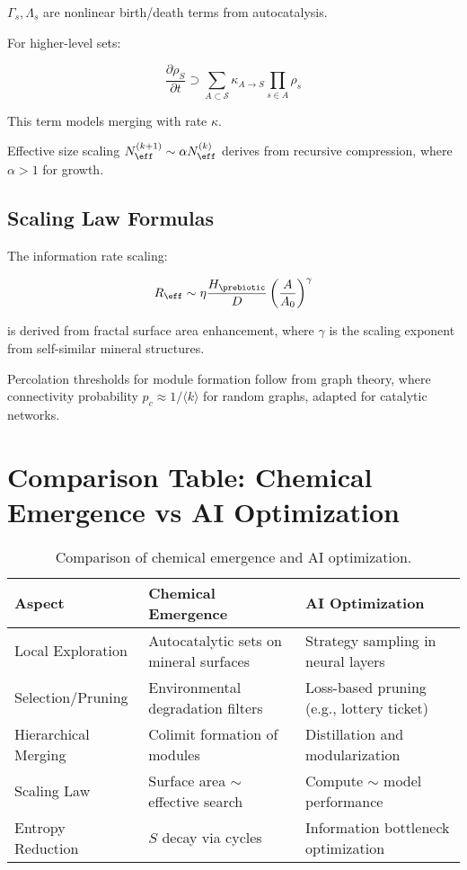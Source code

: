 \documentclass{book}
\begin{document}
$\Gamma_s, \Lambda_s$ are nonlinear birth/death terms from autocatalysis.

For higher-level sets:

\[\frac{\partial \rho_S}{\partial t} \supset \sum_{A \subset \mathcal{S}} \kappa_{A \to S} \prod_{s \in A} \rho_s\]

This term models merging with rate $\kappa$.

Effective size scaling $N_{\eff}^{(k+1)} \sim \alpha N_{\eff}^{(k)}$ derives from recursive compression, where $\alpha > 1$ for growth.

\section{Scaling Law Formulas}
The information rate scaling:

\[R_{\eff} \sim \eta \frac{H_{\prebiotic}}{D} \left( \frac{A}{A_0} \right)^\gamma\]

is derived from fractal surface area enhancement, where $\gamma$ is the scaling exponent from self-similar mineral structures.

Percolation thresholds for module formation follow from graph theory, where connectivity probability $p_c \approx 1 / \langle k \rangle$ for random graphs, adapted for catalytic networks.

\chapter{Comparison Table: Chemical Emergence vs AI Optimization}
\begin{table}[h]
\centering
\begin{tabular}{lll}
\toprule
Aspect & Chemical Emergence & AI Optimization \\
\midrule
Local Exploration & Autocatalytic sets on mineral surfaces & Strategy sampling in neural layers \\
Selection/Pruning & Environmental degradation filters & Loss-based pruning (e.g., lottery ticket) \\
Hierarchical Merging & Colimit formation of modules & Distillation and modularization \\
Scaling Law & Surface area $\sim$ effective search & Compute $\sim$ model performance \\
Entropy Reduction & $S$ decay via cycles & Information bottleneck optimization \\
\bottomrule
\end{tabular}
\caption{Comparison of chemical emergence and AI optimization.}
\end{table}



\end{document}
